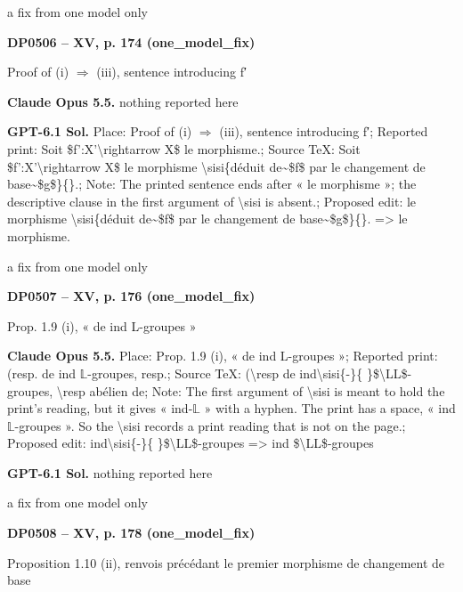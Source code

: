 a fix from one model only\par
\par\noindent\hypertarget{DP0506}{}\textbf{DP0506 -- XV, p. 174 (one\_model\_fix)}\par
Proof of (i) \ensuremath{\Rightarrow} (iii), sentence introducing f′\par
\textbf{Claude Opus 5.5.} nothing reported here\par
\textbf{GPT-6.1 Sol.} Place: Proof of (i) \ensuremath{\Rightarrow} (iii), sentence introducing f′; Reported print: Soit \$f':X'\textbackslash{}rightarrow X\$ le morphisme.; Source TeX: Soit \$f':X'\textbackslash{}rightarrow X\$ le morphisme \textbackslash{}sisi\{déduit de\textasciitilde{}\$f\$ par le changement de base\textasciitilde{}\$g\$\}\{\}.; Note: The printed sentence ends after « le morphisme »; the descriptive clause in the first argument of \textbackslash{}sisi is absent.; Proposed edit: le morphisme \textbackslash{}sisi\{déduit de\textasciitilde{}\$f\$ par le changement de base\textasciitilde{}\$g\$\}\{\}. =\allowbreak > le morphisme.\par
a fix from one model only\par
\par\noindent\hypertarget{DP0507}{}\textbf{DP0507 -- XV, p. 176 (one\_model\_fix)}\par
Prop. 1.9 (i), « de ind L-groupes »\par
\textbf{Claude Opus 5.5.} Place: Prop. 1.9 (i), « de ind L-groupes »; Reported print: (resp. de ind \ensuremath{𝕃}-groupes, resp.; Source TeX: (\textbackslash{}resp de ind\textbackslash{}sisi\{-\}\{ \}\$\textbackslash{}LL\$-groupes, \textbackslash{}resp abélien de; Note: The first argument of \textbackslash{}sisi is meant to hold the print's reading, but it gives « ind-\ensuremath{𝕃} » with a hyphen. The print has a space, « ind \ensuremath{𝕃}-groupes ». So the \textbackslash{}sisi records a print reading that is not on the page.; Proposed edit: ind\textbackslash{}sisi\{-\}\{ \}\$\textbackslash{}LL\$-groupes =\allowbreak > ind \$\textbackslash{}LL\$-groupes\par
\textbf{GPT-6.1 Sol.} nothing reported here\par
a fix from one model only\par
\par\noindent\hypertarget{DP0508}{}\textbf{DP0508 -- XV, p. 178 (one\_model\_fix)}\par
Proposition 1.10 (ii), renvois précédant le premier morphisme de changement de base\par
